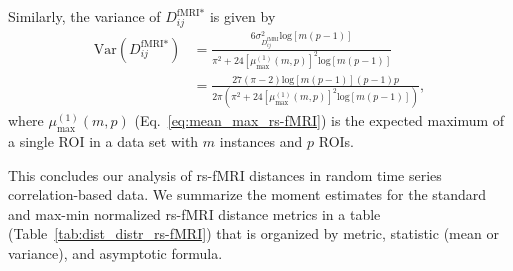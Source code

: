 \documentclass[aoas]{imsart}
\begin{document}
Similarly, the variance of $D^\text{fMRI*}_{ij}$ is given by
%
\begin{equation}\label{eq:var_max-min_rs-fMRI}
\begin{aligned}
\text{Var}\left(D^\text{fMRI*}_{ij}\right) &= \frac{6\sigma^2_{D^\text{fMRI}_{ij}}\text{log}[m(p-1)]}{\pi^2 + 24\left[\mu^{(1)}_\text{max}(m,p)\right]^2\text{log}[m(p-1)]} \\
&= \frac{27(\pi-2)\text{log}[m(p-1)](p-1)p}{2\pi\left(\pi^2 + 24\left[\mu^{(1)}_\text{max}(m,p)\right]^2\text{log}[m(p-1)]\right)},
\end{aligned}
\end{equation}
%
where $\mu^{(1)}_\text{max}(m,p)$ (Eq.~\ref{eq:mean_max_rs-fMRI}) is the expected maximum of a single ROI in a data set with $m$ instances and $p$ ROIs.

This concludes our analysis of rs-fMRI distances in random time series correlation-based data. We summarize the moment estimates for the standard and max-min normalized rs-fMRI distance metrics in a table (Table~\ref{tab:dist_distr_rs-fMRI}) that is organized by metric, statistic (mean or variance), and asymptotic formula.
\end{document}
